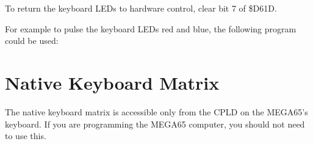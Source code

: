 To return the keyboard LEDs to hardware control, clear bit 7 of \$D61D.

For example to pulse the keyboard LEDs red and blue, the following program
could be used:

\begin{tcolorbox}[colback=black,coltext=white]

\end{tcolorbox}

\section{Native Keyboard Matrix}

The native keyboard matrix is accessible only from the CPLD on the MEGA65's keyboard.
If you are programming the MEGA65 computer, you should not need to use this.

